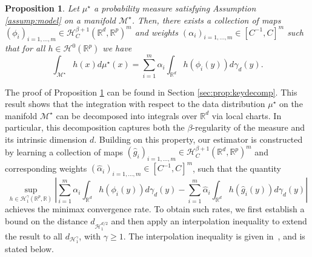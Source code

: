 \documentclass[10pt]{article}
\newtheorem{proposition}{Proposition}
\begin{document}
\begin{proposition}\label{prop:keydecomp}
    Let $\mu^\star$ a probability measure satisfying Assumption \ref{assump:model} on a manifold $\mathcal{M}^\star$. Then, there exists  a collection of maps $(\phi_i)_{i=1,...,m}\in \mathcal{H}^{\beta +1}_C(\mathbb{R}^d,\mathbb{R}^p)^m$ and weights $(\alpha_i)_{i=1,...,m}\in [C^{-1},C]^m$ such that for all  $h\in \mathcal{H}^0(\mathbb{R}^p)$ we have 
    \begin{equation*}
        \int_{\mathcal{M}^\star} h(x)d\mu^\star(x)= \sum_{i=1}^m \alpha_i \int_{\mathbb{R}^d}h(\phi_i(y))d\gamma_d(y).
    \end{equation*}
\end{proposition}
The proof of Proposition \ref{prop:keydecomp} can be found in Section \ref{sec:prop:keydecomp}. This result shows that the integration with respect to the data distribution $\mu^\star$ on the manifold $\mathcal{M}^\star$ can be decomposed into integrals over $\mathbb{R}^d$ via local charts. In particular, this decomposition captures both the $\beta$-regularity of the measure and its intrinsic dimension $d$. Building on this property, our estimator is constructed by learning a collection of maps $(\hat{g}_i)_{i=1,\dots,m} \in \mathcal{H}^{\beta+1}_{C}(\mathbb{R}^d, \mathbb{R}^p)^m$ and corresponding weights $(\hat{\alpha}_i)_{i=1,\dots,m} \in [C^{-1},C]^m$, such that the quantity
\begin{equation}\label{eq:aquantitytobound}
\sup_{h \in \mathcal{H}_1^\gamma(\mathbb{R}^p, \mathbb{R})}\left|\sum_{i=1}^m \alpha_i \int_{\mathbb{R}^d} h(\phi_i(y))  d\gamma_d(y) - \sum_{i=1}^m \hat{\alpha}_i \int_{\mathbb{R}^d} h(\hat{g}_i(y)) d\gamma_d(y)\right|
\end{equation}
achieves the minimax convergence rate.
To obtain such rates, we first establish a bound on the distance $d_{\mathcal{H}^{d/2}_1}$ and then apply an interpolation inequality to extend the result to all $d_{\mathcal{H}^{\gamma}_1}$, with $\gamma \geq 1$. The interpolation inequality is given in~\cite{stephanovitch2024ipm}, and is stated below.
\end{document}
